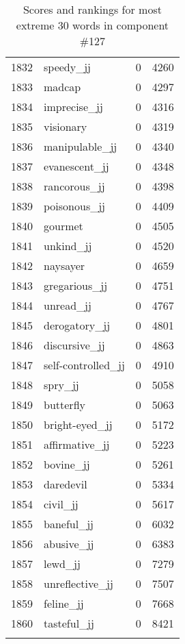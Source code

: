 \begin{longtable}[!htbp]{| rlr@{.}l |}
    1832 & speedy\_jj & 0 & 4260 \\
    1833 & madcap & 0 & 4297 \\
    1834 & imprecise\_jj & 0 & 4316 \\
    1835 & visionary & 0 & 4319 \\
    1836 & manipulable\_jj & 0 & 4340 \\
    1837 & evanescent\_jj & 0 & 4348 \\
    1838 & rancorous\_jj & 0 & 4398 \\
    1839 & poisonous\_jj & 0 & 4409 \\
    1840 & gourmet & 0 & 4505 \\
    1841 & unkind\_jj & 0 & 4520 \\
    1842 & naysayer & 0 & 4659 \\
    1843 & gregarious\_jj & 0 & 4751 \\
    1844 & unread\_jj & 0 & 4767 \\
    1845 & derogatory\_jj & 0 & 4801 \\
    1846 & discursive\_jj & 0 & 4863 \\
    1847 & self-controlled\_jj & 0 & 4910 \\
    1848 & spry\_jj & 0 & 5058 \\
    1849 & butterfly & 0 & 5063 \\
    1850 & bright-eyed\_jj & 0 & 5172 \\
    1851 & affirmative\_jj & 0 & 5223 \\
    1852 & bovine\_jj & 0 & 5261 \\
    1853 & daredevil & 0 & 5334 \\
    1854 & civil\_jj & 0 & 5617 \\
    1855 & baneful\_jj & 0 & 6032 \\
    1856 & abusive\_jj & 0 & 6383 \\
    1857 & lewd\_jj & 0 & 7279 \\
    1858 & unreflective\_jj & 0 & 7507 \\
    1859 & feline\_jj & 0 & 7668 \\
    1860 & tasteful\_jj & 0 & 8421 \\
    \hline
    \caption{Scores and rankings for most extreme 30 words in component \#127} \\
\end{longtable}

